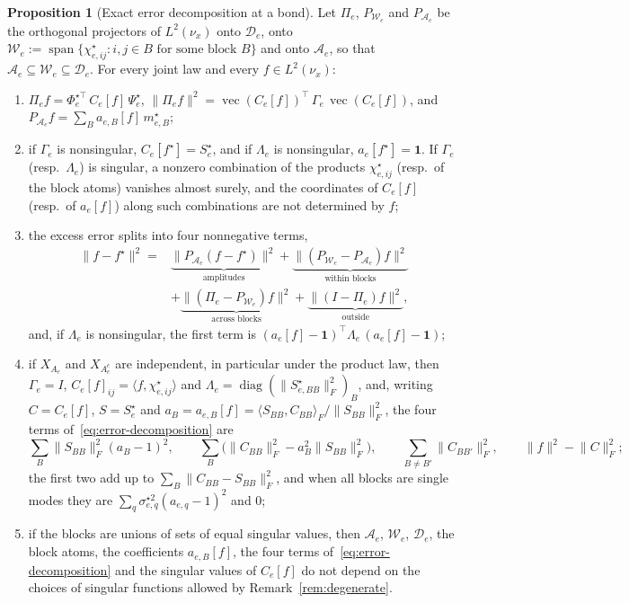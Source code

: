 \documentclass[11pt]{article}
\newcommand{\diag}{\operatorname{diag}}
\newcommand{\vect}{\operatorname{vec}}
\newcommand{\norm}[1]{\lVert #1\rVert}
\theoremstyle{definition}
\newtheorem{proposition}[theorem]{Proposition}
\numberwithin{equation}{section}
\begin{document}
\begin{proposition}[Exact error decomposition at a bond]\label{prop:error-decomposition}
Let $\Pi_e$, $P_{\mathcal W_e}$ and $P_{\mathcal A_e}$ be the orthogonal projectors of $L^2(\nu_x)$ onto $\mathcal D_e$, onto $\mathcal W_e:=\operatorname{span}\{\chi^\star_{e,ij}:i,j\in B\text{ for some block }B\}$ and onto $\mathcal A_e$, so that $\mathcal A_e\subseteq\mathcal W_e\subseteq\mathcal D_e$. For every joint law and every $f\in L^2(\nu_x)$:
\begin{enumerate}[label=(\roman*),nosep]
\item $\Pi_ef=\Phi^{\star\top}_e\,C_e[f]\,\Psi^\star_e$, $\norm{\Pi_ef}^2=\vect(C_e[f])^\top\,\Gamma_e\,\vect(C_e[f])$, and $P_{\mathcal A_e}f=\sum_Ba_{e,B}[f]\,m^\star_{e,B}$;
\item if $\Gamma_e$ is nonsingular, $C_e[f^\star]=S^\star_e$, and if $\Lambda_e$ is nonsingular, $a_e[f^\star]=\mathbf 1$. If $\Gamma_e$ (resp.\ $\Lambda_e$) is singular, a nonzero combination of the products $\chi^\star_{e,ij}$ (resp.\ of the block atoms) vanishes almost surely, and the coordinates of $C_e[f]$ (resp.\ of $a_e[f]$) along such combinations are not determined by $f$;
\item the excess error splits into four nonnegative terms,
\begin{equation}\label{eq:error-decomposition}
\begin{aligned}
\norm{f-f^\star}^2
={}&\underbrace{\norm{P_{\mathcal A_e}(f-f^\star)}^2}_{\text{amplitudes}}
+\underbrace{\norm{(P_{\mathcal W_e}-P_{\mathcal A_e})f}^2}_{\text{within blocks}}\\
&+\underbrace{\norm{(\Pi_e-P_{\mathcal W_e})f}^2}_{\text{across blocks}}
+\underbrace{\norm{(I-\Pi_e)f}^2}_{\text{outside}},
\end{aligned}
\end{equation}
and, if $\Lambda_e$ is nonsingular, the first term is $(a_e[f]-\mathbf 1)^\top\Lambda_e\,(a_e[f]-\mathbf 1)$;
\item if $X_{A_e}$ and $X_{A_e^c}$ are independent, in particular under the product law, then $\Gamma_e=I$, $C_e[f]_{ij}=\langle f,\chi^\star_{e,ij}\rangle$ and $\Lambda_e=\diag(\norm{S^\star_{e,BB}}_F^2)_B$, and, writing $C=C_e[f]$, $S=S^\star_e$ and $a_B=a_{e,B}[f]=\langle S_{BB},C_{BB}\rangle_F/\norm{S_{BB}}_F^2$, the four terms of~\eqref{eq:error-decomposition} are
\[
\sum_B\norm{S_{BB}}_F^2(a_B-1)^2,\qquad\sum_B\big(\norm{C_{BB}}_F^2-a_B^2\norm{S_{BB}}_F^2\big),\qquad\sum_{B\neq B'}\norm{C_{BB'}}_F^2,\qquad\norm f^2-\norm C_F^2;
\]
the first two add up to $\sum_B\norm{C_{BB}-S_{BB}}_F^2$, and when all blocks are single modes they are $\sum_q\sigma^{\star2}_{e,q}(a_{e,q}-1)^2$ and $0$;
\item if the blocks are unions of sets of equal singular values, then $\mathcal A_e$, $\mathcal W_e$, $\mathcal D_e$, the block atoms, the coefficients $a_{e,B}[f]$, the four terms of~\eqref{eq:error-decomposition} and the singular values of $C_e[f]$ do not depend on the choices of singular functions allowed by Remark~\ref{rem:degenerate}.
\end{enumerate}
\end{proposition}
\end{document}
